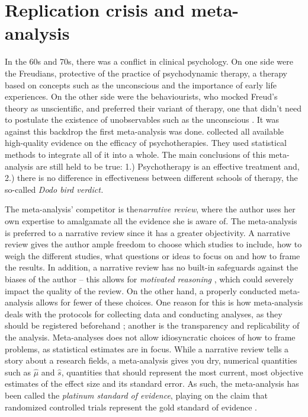 \section{Replication crisis and meta-analysis}

In the 60s and 70s, there was a conflict in clinical psychology. On
one side were the Freudians, protective of the practice of psychodynamic
therapy, a therapy based on concepts such as the unconscious and the
importance of early life experiences. On the other side were the behaviourists,
who mocked Freud's theory as unscientific, and preferred their variant
of therapy, one that didn't need to postulate the existence of unobservables
such as the unconscious \parencite[Chapter 4]{Wampold2019-fe}. It
was against this backdrop the first meta-analysis was done. \cite{Smith1977-vw}
collected all available high-quality evidence on the efficacy of psychotherapies.
They used statistical methods to integrate all of it into a whole.
The main conclusions of this meta-analysis are still held to be true:
1.) Psychotherapy is an effective treatment and, 2.) there is no difference
in effectiveness between different schools of therapy, the so-called
\emph{Dodo bird verdict.}

The meta-analysis' competitor is the\emph{narrative review}, where
the author uses her own expertise to amalgamate all the evidence she
is aware of. The meta-analysis is preferred to a narrative review
since it has a greater objectivity. A narrative review gives the author
ample freedom to choose which studies to include, how to weigh the
different studies, what questions or ideas to focus on and how to
frame the results. In addition, a narrative review has no built-in
safeguards against the biases of the author -- this allows for \emph{motivated
reasoning }\parencite{Kunda1990-ry}, which could severely impact
the quality of the review. On the other hand, a properly conducted
meta-analysis allows for fewer of these choices. One reason for this
is how meta-analysis deals with the protocols for collecting data
and conducting analyses, as they should be registered beforehand \parencite{Egger1997-ue};
another is the transparency and replicability of the analysis. Meta-analyses
does not allow idiosyncratic choices of how to frame problems, as
statistical estimates are in focus. While a narrative review tells
a story about a research fields, a meta-analysis gives you dry, numerical
quantities such as $\widehat{\mu}$ and $\widehat{s}$, quantities
that should represent the most current, most objective estimates of
the effect size and its standard error. As such, the meta-analysis
has been called the \emph{platinum standard of evidence}, playing
on the claim that randomized controlled trials represent the gold
standard of evidence \parencite{Stegenga2011-zo}.

